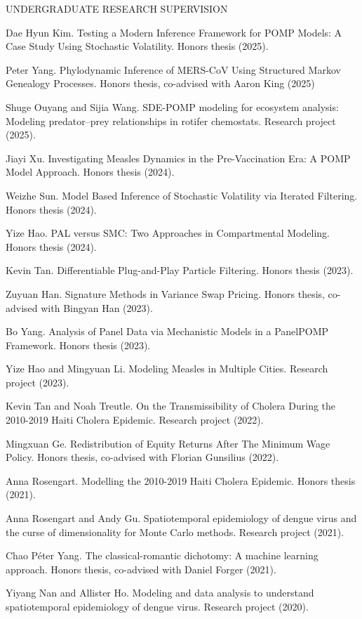 \lsp
\begin{reflist}{UNDERGRADUATE RESEARCH SUPERVISION}
\item{Dae Hyun Kim}. Testing a Modern Inference Framework for POMP Models: A Case Study Using Stochastic Volatility. Honors thesis (2025).
  \item{Peter Yang}. Phylodynamic Inference of MERS-CoV Using Structured Markov Genealogy Processes. Honors thesis, co-advised with Aaron King (2025)
\item{Shuge Ouyang and Sijia Wang}. SDE-POMP modeling for ecosystem analysis:
Modeling predator–prey relationships in rotifer chemostats. Research project (2025).
\item{Jiayi Xu}. Investigating Measles Dynamics in the Pre-Vaccination Era: A POMP Model Approach. Honors thesis (2024).
\item{Weizhe Sun}. Model Based Inference of Stochastic Volatility via Iterated Filtering. Honors thesis (2024).
\item{Yize Hao}. PAL versus SMC: Two Approaches in Compartmental Modeling. Honors thesis (2024).
\item{Kevin Tan}. Differentiable Plug-and-Play Particle Filtering. Honors thesis (2023).
\item{Zuyuan Han}. Signature Methods in Variance Swap Pricing. Honors thesis, co-advised with Bingyan Han (2023).  
\item{Bo Yang}. Analysis of Panel Data via Mechanistic Models in a PanelPOMP Framework. Honors thesis (2023).
  \item{Yize Hao and Mingyuan Li}. Modeling Measles in Multiple Cities. Research project (2023).
\item{Kevin Tan and Noah Treutle}. On the Transmissibility of Cholera During the 2010-2019 Haiti Cholera Epidemic. Research project (2022).
\item{Mingxuan Ge}. Redistribution of Equity Returns After The Minimum Wage Policy. Honors thesis, co-advised with Florian Gunsilius (2022).
\item{Anna Rosengart}. Modelling the 2010-2019 Haiti Cholera Epidemic. Honors thesis (2021).
\item{Anna Rosengart and Andy Gu}. Spatiotemporal epidemiology of dengue virus and the curse of dimensionality for Monte Carlo methods. Research project (2021).
  \item{Chao P{\'e}ter Yang}. The classical-romantic dichotomy: A machine learning approach. Honors thesis, co-advised with Daniel Forger (2021).
  \item{Yiyang Nan and Allister Ho}. Modeling and data analysis to understand spatiotemporal epidemiology of dengue virus. Research project (2020).

\end{reflist}

